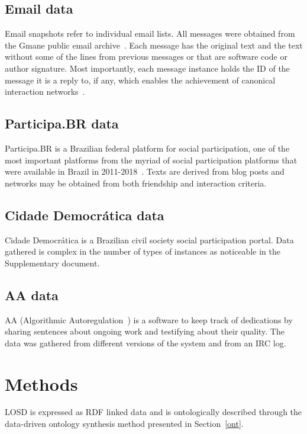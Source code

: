 \documentclass[data,datadescriptor,submit,moreauthors,pdftex]{Definitions/mdpi}
\begin{document}
\subsection{Email data}
Email snapshots refer to individual email lists.
All messages were obtained from the Gmane public email archive~\cite{gmane}.
Each message has the original text and the text without some of the lines
from previous messages or that are software code or author signature.
Most importantly, each message instance holds the ID of the message it is
a reply to, if any, which enables the achievement of canonical interaction networks~\cite{bird,stab}.

\subsection{Participa.BR data}
Participa.BR is a Brazilian federal platform for social participation,
one of the most important platforms from the myriad of social participation platforms
that were available in Brazil in 2011-2018~\cite{spbr}.
Texts are derived from blog posts and networks may be obtained from
both friendship and interaction criteria.

\subsection{Cidade Democrática data}
Cidade Democrática is a Brazilian civil society social participation portal.
Data gathered is complex in the number of types of instances
as noticeable in the Supplementary document.

\subsection{AA data}
AA (Algorithmic Autoregulation~\cite{aa,aa2}) is a software to keep track of dedications by
sharing sentences about ongoing work and testifying about their quality.
The data was gathered from different versions of the system and from an IRC
log.
 

\section{Methods}\label{methods}
LOSD is expressed as RDF linked data
and is ontologically described through the
data-driven ontology synthesis method presented in Section~\ref{ont}.
\end{document}
